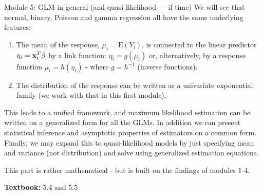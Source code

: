 \documentclass[
  ignorenonframetext,
]{beamer}
\begin{document}
\begin{frame}
\begin{block}{Module 5: GLM in general (and quasi likelihood --- if
time)}
\protect\hypertarget{module-5-glm-in-general-and-quasi-likelihood-if-time}{}
We will see that normal, binary, Poisson and gamma regression all have
the same underlying features:

\begin{enumerate}
\item
  The mean of the response, \(\mu_i=\text{E}(Y_i)\), is connected to the
  linear predictor \(\eta_i={\bf x}_i^T \beta\) by a link function:
  \(\eta_i=g(\mu_i)\) or, alternatively, by a response function
  \(\mu_i=h(\eta_i)\) - where \(g=h^{-1}\) (inverse functions).
\item
  The distribution of the response can be written as a univariate
  exponential family (we work with that in this first module).
\end{enumerate}

This leads to a unified framework, and maximum likelihood estimation can
be written on a generalized form for all the GLMs. In addition we can
present statistical inference and asymptotic properties of estimators on
a common form. Finally, we may expand this to quasi-likelihood models by
just specifying mean and variance (not distribution) and solve using
generalized estimation equations.
\end{block}
\end{frame}

\begin{frame}
This part is rather mathematical - but is built on the findings of
modules 1-4.

\textbf{Textbook:} 5.4 and 5.5
\end{frame}
\end{document}
